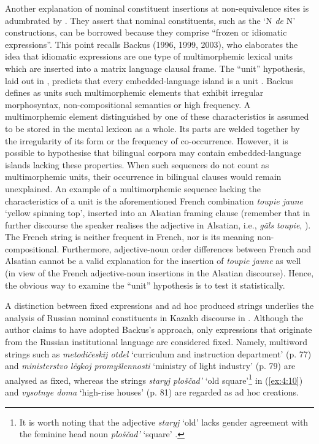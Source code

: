 \begin{sloppypar}
Another explanation of nominal constituent insertions at non-equivalence sites is adumbrated by \citet[215]{poplack-meechan-1995}. They assert that nominal constituents, such as the `N \textit{de} N' constructions, can be borrowed because they comprise ``frozen or idiomatic expressions''. This point recalls Backus (1996, 1999, 2003), who elaborates the idea that idiomatic expressions are one type of multimorphemic lexical units which are inserted into a matrix language clausal frame. The ``unit'' hypothesis, laid out in , predicts that every embedded-language island is a unit \citep[cf.][91]{backus-units-2003}. Backus defines as units such multimorphemic elements that exhibit irregular morphosyntax, non-compositional semantics or high frequency. A multimorphemic element distinguished by one of these characteristics is assumed to be stored in the mental lexicon as a whole. Its parts are welded together by the irregularity of its form or the frequency of co-occurrence. However, it is possible to hypothesise that bilingual corpora may contain embedded-language islands lacking these properties. When such sequences do not count as multimorphemic units, their occurrence in bilingual clauses would remain unexplained. An example of a multimorphemic sequence lacking the characteristics of a unit is the aforementioned French combination \textit{toupie jaune} `yellow spinning top', inserted into an Alsatian framing clause (remember that in further discourse the speaker realises the adjective in Alsatian, i.e., \textit{gäls toupie}, \citealt[133]{gardner-chloros-1991}). The French string is neither frequent in French, nor is its meaning non-compositional. Furthermore, adjective-noun order differences between French and Alsatian cannot be a valid explanation for the insertion of \textit{toupie jaune} as well (in view of the French adjective-noun insertions in the Alsatian discourse). Hence, the obvious way to examine the ``unit'' hypothesis is to test it statistically.
\end{sloppypar}

A distinction between fixed expressions and ad hoc produced strings underlies the analysis of Russian nominal constituents in Kazakh discourse in \citet[77--88]{muhamedowa-untersuchung-2006}. Although the author claims to have adopted Backus's approach, only expressions that originate from the Russian institutional language are considered fixed. Namely, multiword strings such as \textit{metodičeskij otdel} `curriculum and instruction department' (p. 77) and  \textit{ministerstvo lëgkoj promyšlennosti} `ministry of light industry' (p. 79) are analysed as fixed, whereas the strings \textit{staryj ploščad'} `old square'\footnote{It is worth noting that the adjective \textit{staryj} `old' lacks gender agreement with the feminine head noun \textit{ploščad'} `square' \citep[82]{muhamedowa-untersuchung-2006}.} in (\ref{ex:4:10}) and \textit{vysotnye doma} `high-rise houses' (p. 81) are regarded as ad hoc creations. 

